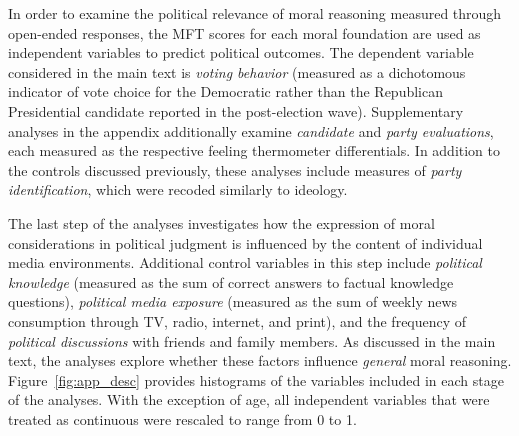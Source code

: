 \documentclass[12pt]{article}
\begin{document}
In order to examine the political relevance of moral reasoning measured through open-ended responses, the MFT scores for each moral foundation are used as independent variables to predict political outcomes. The dependent variable considered in the main text is \textit{voting behavior} (measured as a dichotomous indicator of vote choice for the Democratic rather than the Republican Presidential candidate reported in the post-election wave). Supplementary analyses in the appendix additionally examine \textit{candidate} and \textit{party evaluations}, each measured as the respective feeling thermometer differentials. In addition to the controls discussed previously, these analyses include measures of \textit{party identification}, which were recoded similarly to ideology.

The last step of the analyses investigates how the expression of moral considerations in political judgment is influenced by the content of individual media environments. Additional control variables in this step include \textit{political knowledge} (measured as the sum of correct answers to factual knowledge questions), \textit{political media exposure} (measured as the sum of weekly news consumption through TV, radio, internet, and print), and the frequency of \textit{political discussions} with friends and family members. As discussed in the main text, the analyses explore whether these factors influence \textit{general} moral reasoning. Figure~\ref{fig:app_desc} provides histograms of the variables included in each stage of the analyses. With the exception of age, all independent variables that were treated as continuous were rescaled to range from 0 to 1.
\end{document}
